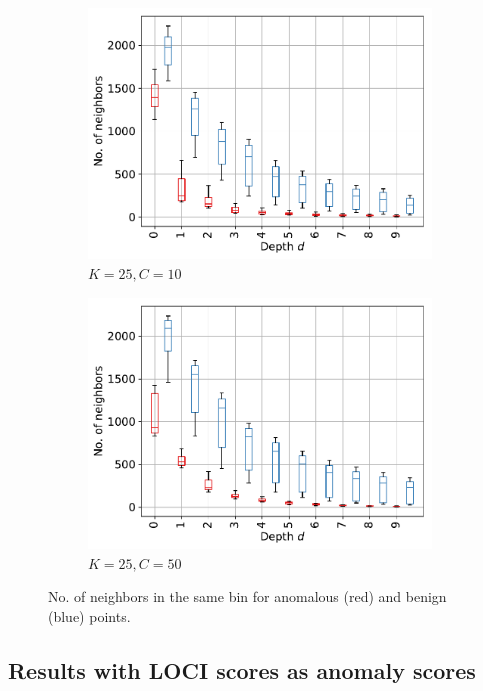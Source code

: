\documentclass[11pt,onecolumn]{article}
\begin{document}
\begin{figure}[h!]
\begin{subfigure}[t]{0.24\textwidth}
        \includegraphics[width=\linewidth]{fig/chains_hist_k25c10d10.pdf}
        \caption{$K=25, C=10$}
    \end{subfigure}
		\hfill
    \begin{subfigure}[t]{0.24\textwidth}
        \centering
        \includegraphics[width=\linewidth]{fig/chains_hist_k25c50d10.pdf}
        \caption{$K=25, C=50$}
    \end{subfigure}
    \caption{No. of neighbors in the same bin for anomalous (red) and benign (blue) points.}
\end{figure}

\subsection{Results with LOCI scores as anomaly scores}
\end{document}
